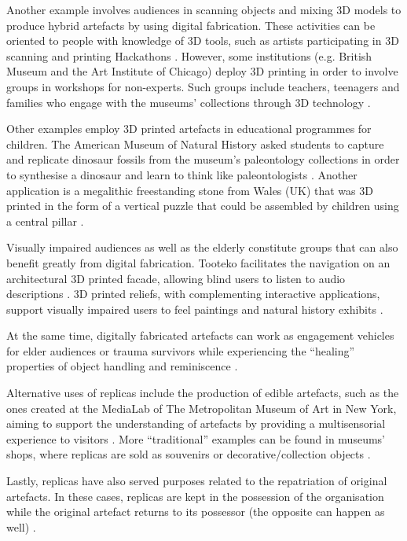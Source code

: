 \documentclass[acmlarge,screen]{acmart}
\begin{document}
Another example involves audiences in scanning objects and mixing 3D models to produce hybrid artefacts by using digital fabrication. These activities can be oriented to people with knowledge of 3D tools, such as artists participating in 3D scanning and printing Hackathons \cite{Mullaney2012,Neely2013}. However, some institutions (e.g. British Museum and the Art Institute of Chicago) deploy 3D printing in order to involve groups in workshops for non-experts. Such groups include teachers, teenagers and families who engage with the museums' collections through 3D technology \cite{BritishMuseum2016,Neely2015,Miles2015}.  

Other examples employ 3D printed artefacts in educational programmes for children. The American Museum of Natural History asked students to capture and replicate dinosaur fossils from the museum's paleontology collections in order to synthesise a dinosaur and learn to think like paleontologists \cite{AMNH2013}. Another application is a megalithic freestanding stone from Wales (UK) that was 3D printed in the form of a vertical puzzle that could be assembled by children using a central pillar \cite{Miles2015}.

Visually impaired audiences as well as the elderly constitute groups that can also benefit greatly from digital fabrication. Tooteko facilitates the navigation on an architectural 3D printed facade, allowing blind users to listen to audio descriptions \cite{DAgnano2015}. 3D printed reliefs, with complementing interactive applications, support visually impaired users to feel paintings and natural history exhibits \cite{Reichinger2016a,Samaroudi2017}.

At the same time, digitally fabricated artefacts can work as engagement vehicles for elder audiences or trauma survivors while experiencing the ``healing'' properties of object handling and reminiscence \cite{PleaseTouch2016}.

Alternative uses of replicas include the production of edible artefacts, such as the ones created at the MediaLab of The Metropolitan Museum of Art in New York, aiming to support the understanding of artefacts by providing a multisensorial experience to visitors \cite{Tang2015}. More ``traditional'' examples can be found in museums' shops, where replicas are sold as souvenirs or decorative/collection objects \cite{Young2017}.

Lastly, replicas have also served purposes related to the repatriation of original artefacts. In these cases, replicas are kept in the possession of the organisation while the original artefact returns to its possessor (the opposite can happen as well) \cite{Hollinger2013}.  
 
\end{document}
